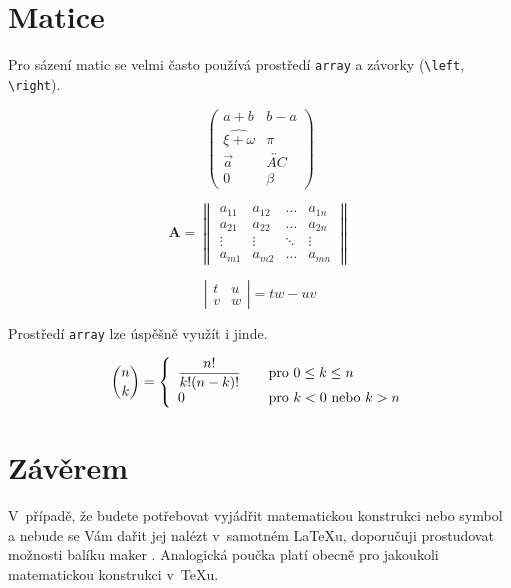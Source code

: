 \documentclass[a4paper,11pt,twocolumn]{article}
\theoremstyle{definition}
\theoremstyle{plain}
\theoremstyle{definition}
\begin{document}
\section{Matice}
Pro sázení matic se velmi často používá prostředí \texttt{array} a závorky (\verb|\left|, \verb|\right|). 
\par
$$\left(
  \begin{array}{ccc}
    a + b & b - a \\
    \widehat{\xi + \omega} & \pi \\
    \vec{a} & \overleftrightarrow{AC}\\
    0 & \beta
    \end{array}
\right)$$

$$\mathbf{A}=\left\|\begin{array}{cccc}
a_{11} & a_{12} & \ldots & a_{1n} \\
a_{21} & a_{22} & \ldots & a_{2n} \\
\vdots & \vdots & \ddots & \vdots \\
a_{m1} & a_{m2} & \ldots & a_{mn}
\end{array}\right\|$$

$$\left|\begin{array}{cc}
t & u \\ 
v & w
\end{array}\right| = tw - uv$$

Prostředí \texttt{array} lze úspěšně využít i jinde.
\par
$$\binom{n}{k} = \left\{ 
\begin{array}{l l}
  \displaystyle\frac{n!}{k!(n-k)!} & \quad \mbox{pro $0 \leq k \leq n$}\\
  0 & \quad \mbox{pro $k < 0$ nebo $k > n$}\\
\end{array} \right. $$
\par
\section{Závěrem}
V~případě, že budete potřebovat vyjádřit matema\-tickou konstrukci nebo symbol a nebude se Vám dařit jej nalézt v~samotném \LaTeX{u}, doporučuji prostudovat možnosti balíku maker \AmSLaTeX.
Analogická poučka platí obecně pro jakoukoli matematickou konstrukci v~\TeX{u}.
\end{document}

